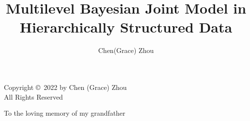 \documentclass{ucthesis}
\def\blankpage{%
      \clearpage%
      \thispagestyle{plain}%
      \null%
      \clearpage}
\begin{document}

\title{Multilevel Bayesian Joint Model in Hierarchically Structured Data}
\author{Chen(Grace) Zhou}


\maketitle

\newpage
\thispagestyle{empty}
\vspace*{\fill}
\begin{center}
    Copyright \copyright\ 2022 by Chen (Grace) Zhou \\All Rights Reserved
\end{center}



\begin{center}
To the loving memory of my grandfather
\end{center}

\end{document}
